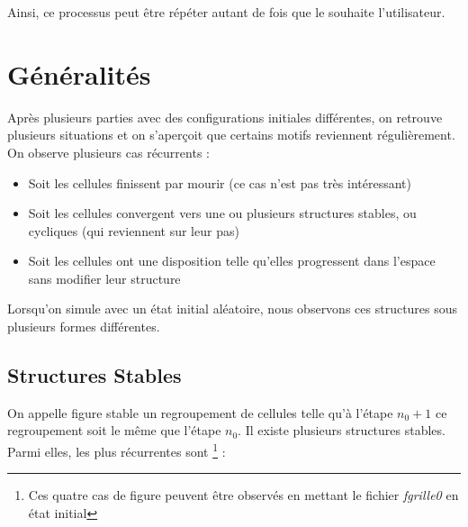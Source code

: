 \documentclass[12,french]{report}
\begin{document}
Ainsi, ce processus peut être répéter autant de fois que le souhaite l'utilisateur. \\

\chapter{Généralités}

Après plusieurs parties avec des configurations initiales différentes, on retrouve plusieurs situations et on s'aperçoit que certains motifs reviennent régulièrement.\\

On observe plusieurs cas récurrents : 

\begin{itemize}[label=\textbullet]
	\item Soit les cellules finissent par mourir (ce cas n'est pas très intéressant)
	\item Soit les cellules convergent vers une ou plusieurs structures stables, ou cycliques (qui reviennent sur leur pas)
	\item Soit les cellules ont une disposition telle qu'elles progressent dans l'espace sans modifier leur structure
\end{itemize}\vspace{0.25cm}

Lorsqu'on simule avec un état initial aléatoire, nous observons ces structures sous plusieurs formes différentes.

\section{Structures Stables}

On appelle figure stable un regroupement de cellules telle qu'à l'étape $n_{0}+1$ ce regroupement soit le même que l'étape $n_{0}$. Il existe plusieurs structures stables. Parmi elles, les plus récurrentes sont \footnote{Ces quatre cas de figure peuvent être observés en mettant le fichier \textit{fgrille0} en état initial} \vspace{0.3cm} :
\end{document}
